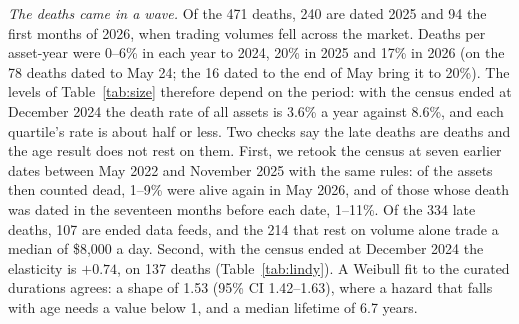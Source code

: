 \documentclass[11pt]{article}
\begin{document}
\emph{The deaths came in a wave.} Of the 471 deaths, 240 are dated 2025 and 94 the first months of 2026, when trading volumes fell across the market. Deaths per asset-year were 0--6\% in each year to 2024, 20\% in 2025 and 17\% in 2026 (on the 78 deaths dated to May 24; the 16 dated to the end of May bring it to 20\%). The levels of Table~\ref{tab:size} therefore depend on the period: with the census ended at December 2024 the death rate of all assets is 3.6\% a year against 8.6\%, and each quartile's rate is about half or less. Two checks say the late deaths are deaths and the age result does not rest on them. First, we retook the census at seven earlier dates between May 2022 and November 2025 with the same rules: of the assets then counted dead, 1--9\% were alive again in May 2026, and of those whose death was dated in the seventeen months before each date, 1--11\%. Of the 334 late deaths, 107 are ended data feeds, and the 214 that rest on volume alone trade a median of \$8,000 a day. Second, with the census ended at December 2024 the elasticity is $+0.74$, on 137 deaths (Table~\ref{tab:lindy}). A Weibull fit to the curated durations agrees: a shape of 1.53 (95\% CI 1.42--1.63), where a hazard that falls with age needs a value below 1, and a median lifetime of 6.7 years.
\end{document}
